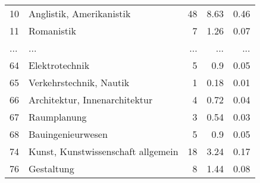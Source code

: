 \begin{longtable}{lXrrr}
        10 & \multicolumn{1}{X}{Anglistik, Amerikanistik} & %
          \num{48} &
          \num[round-mode=places,round-precision=2]{8.63} &
          \num[round-mode=places,round-precision=2]{0.46} \\
        11 & \multicolumn{1}{X}{Romanistik} & %
          \num{7} &
          \num[round-mode=places,round-precision=2]{1.26} &
          \num[round-mode=places,round-precision=2]{0.07} \\
       ... & ... & ... & ... & ... \\
        64 & \multicolumn{1}{X}{Elektrotechnik} & %
          \num{5} &
          \num[round-mode=places,round-precision=2]{0.9} &
          \num[round-mode=places,round-precision=2]{0.05} \\

        65 & \multicolumn{1}{X}{Verkehrstechnik, Nautik} & %
          \num{1} &
          \num[round-mode=places,round-precision=2]{0.18} &
          \num[round-mode=places,round-precision=2]{0.01} \\

        66 & \multicolumn{1}{X}{Architektur, Innenarchitektur} & %
          \num{4} &
          \num[round-mode=places,round-precision=2]{0.72} &
          \num[round-mode=places,round-precision=2]{0.04} \\

        67 & \multicolumn{1}{X}{Raumplanung} & %
          \num{3} &
          \num[round-mode=places,round-precision=2]{0.54} &
          \num[round-mode=places,round-precision=2]{0.03} \\

        68 & \multicolumn{1}{X}{Bauingenieurwesen} & %
          \num{5} &
          \num[round-mode=places,round-precision=2]{0.9} &
          \num[round-mode=places,round-precision=2]{0.05} \\

        74 & \multicolumn{1}{X}{Kunst, Kunstwissenschaft allgemein} & %
          \num{18} &
          \num[round-mode=places,round-precision=2]{3.24} &
          \num[round-mode=places,round-precision=2]{0.17} \\

        76 & \multicolumn{1}{X}{Gestaltung} & %
          \num{8} &
          \num[round-mode=places,round-precision=2]{1.44} &
          \num[round-mode=places,round-precision=2]{0.08} \\


\end{longtable}
